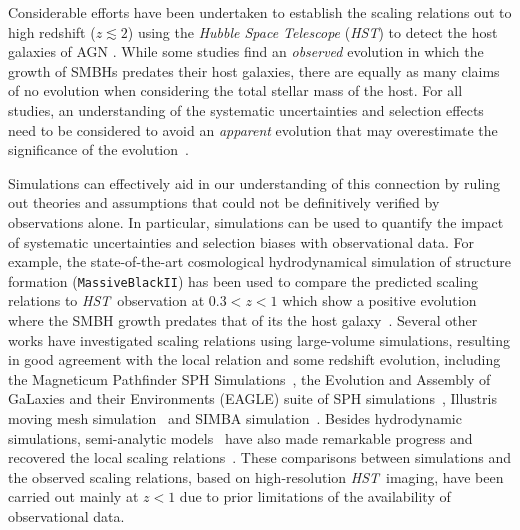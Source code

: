 \documentclass[twocolumn,trackchanges]{aastex63}
\newcommand{\hst}{{\it HST}}
\begin{document}
Considerable efforts have been undertaken to establish the scaling relations out to high redshift ($z \lesssim2$) using the {\it Hubble Space Telescope} (\hst) to detect the host galaxies of AGN \citep[e.g.,][]{Peng2006a, Tre++07, Woo++08,Jahnke2009,Bennert11,Schramm2013,Park15,Mechtley2016,Ding2020}. While some studies find an {\it observed} evolution in which the growth of SMBHs predates their host galaxies, there are equally as many claims of no evolution when considering the total stellar mass of the host. For all studies, an understanding of the systematic uncertainties and selection effects~\citep{Tre++07,Lauer2007,Schulze2014} need to be considered to avoid an {\it apparent} evolution that may overestimate the significance of the evolution~\citep{Volonteri2011}.


Simulations can effectively aid in our understanding of this connection by ruling out theories and assumptions that could not be definitively verified by observations alone. In particular, simulations can be used to quantify the impact of systematic uncertainties and selection biases with observational data. For example, the state-of-the-art cosmological hydrodynamical simulation of structure formation (\texttt{MassiveBlackII}) has been used to compare the predicted scaling relations to \hst\ observation at $0.3<z<1$ which show a positive evolution where the SMBH growth predates that of its the host galaxy~\citep{DeG++15}. Several other works have investigated scaling relations using large-volume simulations, resulting in good agreement with the local relation and some redshift evolution, including the Magneticum Pathfinder SPH Simulations~\citep{Steinborn2015}, the Evolution and Assembly of GaLaxies and their Environments (EAGLE) suite of SPH simulations~\citep{Schaye2015}, Illustris moving mesh simulation~\citep{Sijacki2015, Vogelsberger2014, Li2019} and SIMBA simulation~\citep{Thomas2019}. Besides hydrodynamic simulations, semi-analytic models~\citep[e.g.,][]{Menci2014, Menci2016} have also made remarkable progress and recovered the local scaling relations~\citep{Kormendy13}. These comparisons between simulations and the observed scaling relations, based on high-resolution \hst\ imaging, have been carried out mainly at $z<1$ due to prior limitations of the availability of observational data.
\end{document}
